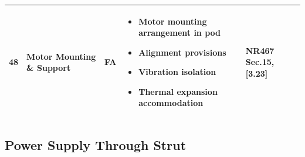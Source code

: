 \documentclass[11pt,a4paper]{report}
\newcommand{\fa}{\textbf{\textcolor{warningred}{FA}}}
\begin{document}
\begin{longtable}{|p{0.5cm}|p{5cm}|p{1.5cm}|p{5.5cm}|p{2cm}|}
48 & Motor Mounting \& Support & \fa{} & 
\begin{itemize}[leftmargin=*,nosep]
\item Motor mounting arrangement in pod
\item Alignment provisions
\item Vibration isolation
\item Thermal expansion accommodation
\end{itemize} & NR467 Sec.15, [3.23] \\
\hline

\end{longtable}

\subsection{Power Supply Through Strut}
\end{document}
